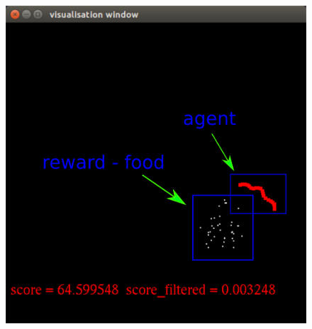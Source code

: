 \documentclass[10pt,a4paper]{article}
\begin{document}
\begin{figure}[!htb]
\centering
\begin{minipage}{.5\textwidth}
  \centering
  \includegraphics[scale=0.3]{../../diagrams/worms_rl_game_desc.png}
  \label{img:Testing snake game}
\end{minipage}%
\begin{minipage}{.5\textwidth}
  \centering

\end{minipage}
\end{figure}
\end{document}
